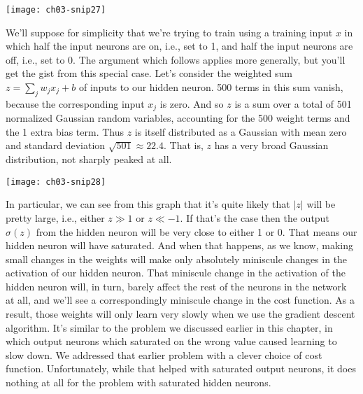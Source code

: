 \begin{marginfigure}
    \texttt{[image: ch03-snip27]}
    \end{marginfigure}
    
We'll suppose for simplicity that we're trying to train using a training input $x$ in which half the input neurons are on, i.e., set to 1, and half the input neurons are off, i.e., set to 0. The argument which follows applies more generally, but you'll get the gist from this special case. Let's consider the weighted sum $z=\sum_{j} w_{j} x_{j}+b$ of inputs to our hidden neuron. 500 terms in this sum vanish, because the corresponding input $x_j$ is zero. And so $z$ is a sum over a total of 501 normalized Gaussian random variables, accounting for the 500 weight terms and the 1 extra bias term. Thus $z$ is itself distributed as a Gaussian with mean zero and standard deviation $\sqrt{501} \approx 22.4$. That is, $z$ has a very broad Gaussian distribution, not sharply peaked at all.


\begin{marginfigure}
    \texttt{[image: ch03-snip28]}
    \end{marginfigure}

In particular, we can see from this graph that it's quite likely that $|z|$ will be pretty large, i.e., either $z\gg 1$ or $z\ll -1$. If that's the case then the output $\sigma(z)$ from the hidden neuron will be very close to either 1 or 0. That means our hidden neuron will have saturated. And when that happens, as we know, making small changes in the weights will make only absolutely miniscule changes in the activation of our hidden neuron. That miniscule change in the activation of the hidden neuron will, in turn, barely affect the rest of the neurons in the network at all, and we'll see a correspondingly miniscule change in the cost function. As a result, those weights will only learn very slowly when we use the gradient descent algorithm. It's similar to the problem we discussed earlier in this chapter, in which output neurons which saturated on the wrong value caused learning to slow down. We addressed that earlier problem with a clever choice of cost function. Unfortunately, while that helped with saturated output neurons, it does nothing at all for the problem with saturated hidden neurons.

